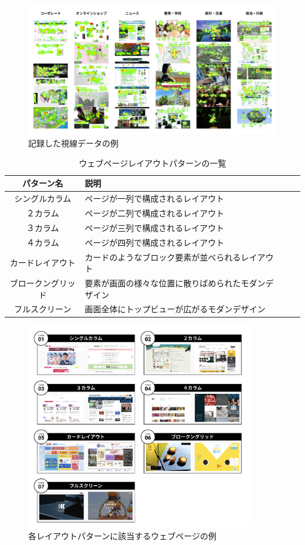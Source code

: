 \begin{figure}[H]
  \centering
  \includegraphics[width=12.5cm]{figures/05_dataset_saliency.jpg}
  \caption{記録した視線データの例}
  \label{fig_dataset-saliency}
\end{figure}

\begin{table}[h]
  \caption{ウェブページレイアウトパターンの一覧}
  \label{table:layoutpattern}
  \centering
    \begin{tabular}{clll}
    \hline
    パターン名 & 説明 \\
    \hline \hline
    シングルカラム & ページが一列で構成されるレイアウト \\
    ２カラム & ページが二列で構成されるレイアウト \\
    ３カラム & ページが三列で構成されるレイアウト \\
    ４カラム & ページが四列で構成されるレイアウト \\
    カードレイアウト & カードのようなブロック要素が並べられるレイアウト \\
    ブロークングリッド & 要素が画面の様々な位置に散りばめられたモダンデザイン \\
    フルスクリーン & 画面全体にトップビューが広がるモダンデザイン \\
    \hline
  \end{tabular}
\end{table}

\begin{figure}[H]
  \centering
  \includegraphics[width=10cm]{figures/05_layout.jpg}
  \caption{各レイアウトパターンに該当するウェブページの例}
  \label{fig_layout_example}
\end{figure}

